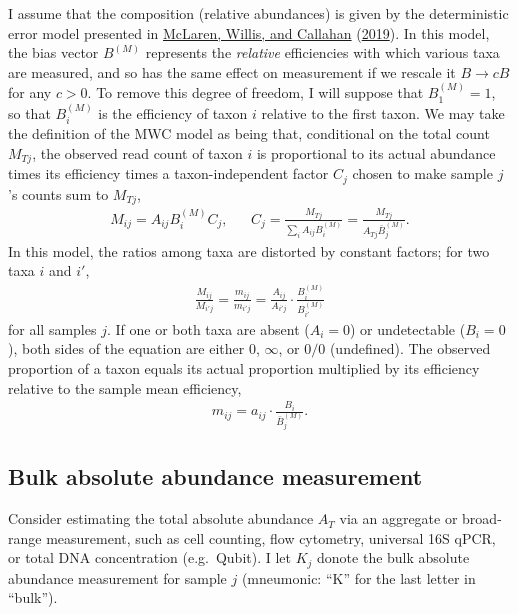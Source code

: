 \documentclass[
]{article}
\theoremstyle{definition}
\theoremstyle{definition}
\theoremstyle{definition}
\theoremstyle{definition}
\theoremstyle{remark}
\begin{document}
I assume that the composition (relative abundances) is given by the deterministic error model presented in \protect\hyperlink{ref-mclaren2019cons}{McLaren, Willis, and Callahan} (\protect\hyperlink{ref-mclaren2019cons}{2019}).
In this model, the bias vector \(B^{(M)}\) represents the \emph{relative} efficiencies with which various taxa are measured, and so has the same effect on measurement if we rescale it \(B \to cB\) for any \(c > 0\).
To remove this degree of freedom, I will suppose that \(B^{(M)}_{1} = 1\), so that \(B^{(M)}_i\) is the efficiency of taxon \(i\) relative to the first taxon.
We may take the definition of the MWC model as being that, conditional on the total count \(M_{Tj}\), the observed read count of taxon \(i\) is proportional to its actual abundance times its efficiency times a taxon-independent factor \(C_j\) chosen to make sample \(j\)'s counts sum to \(M_{Tj}\),
\begin{align}
  \label{eq:M}
  M_{ij} = A_{ij} B^{(M)}_{i} C_j, && 
  C_j = \frac{M_{Tj}}{\sum_i A_{ij} B^{(M)}_{i}}
      = \frac{M_{Tj}}{A_{Tj} \bar B^{(M)}_j}.
\end{align}
In this model, the ratios among taxa are distorted by constant factors; for two taxa \(i\) and \(i'\),
\begin{align}
  \label{eq:M-ratio}
  \frac{M_{ij}}{M_{i'j}} 
    = \frac{m_{ij}}{m_{i'j}} 
    = \frac{A_{ij}}{A_{i'j}} \cdot \frac{B^{(M)}_{i}}{B^{(M)}_{i'}}
\end{align}
for all samples \(j\).
If one or both taxa are absent (\(A_i = 0\)) or undetectable (\(B_i = 0\)), both sides of the equation are either \(0\), \(\infty\), or \(0/0\) (undefined).
The observed proportion of a taxon equals its actual proportion multiplied by its efficiency relative to the sample mean efficiency,
\begin{align}
  \label{eq:m}
  m_{ij} = a_{ij} \cdot \frac{B_i}{\bar B^{(M)}_j}.
\end{align}

\hypertarget{bulk-absolute-abundance-measurement}{%
\subsection{Bulk absolute abundance measurement}\label{bulk-absolute-abundance-measurement}}

Consider estimating the total absolute abundance \(A_{T}\) via an aggregate or broad-range measurement, such as cell counting, flow cytometry, universal 16S qPCR, or total DNA concentration (e.g.~Qubit).
I let \(K_j\) donote the bulk absolute abundance measurement for sample \(j\) (mneumonic: ``K'' for the last letter in ``bulk'').
\end{document}
